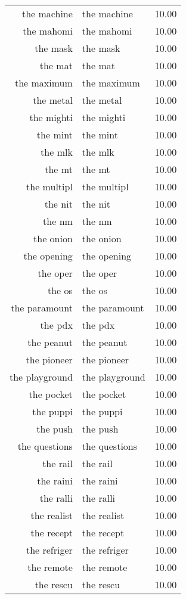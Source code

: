\begin{table}[ht]
\begin{tabular}{rlr}
  the machine & the machine & 10.00 \\ 
  the mahomi & the mahomi & 10.00 \\ 
  the mask & the mask & 10.00 \\ 
  the mat & the mat & 10.00 \\ 
  the maximum & the maximum & 10.00 \\ 
  the metal & the metal & 10.00 \\ 
  the mighti & the mighti & 10.00 \\ 
  the mint & the mint & 10.00 \\ 
  the mlk & the mlk & 10.00 \\ 
  the mt & the mt & 10.00 \\ 
  the multipl & the multipl & 10.00 \\ 
  the nit & the nit & 10.00 \\ 
  the nm & the nm & 10.00 \\ 
  the onion & the onion & 10.00 \\ 
  the opening & the opening & 10.00 \\ 
  the oper & the oper & 10.00 \\ 
  the os & the os & 10.00 \\ 
  the paramount & the paramount & 10.00 \\ 
  the pdx & the pdx & 10.00 \\ 
  the peanut & the peanut & 10.00 \\ 
  the pioneer & the pioneer & 10.00 \\ 
  the playground & the playground & 10.00 \\ 
  the pocket & the pocket & 10.00 \\ 
  the puppi & the puppi & 10.00 \\ 
  the push & the push & 10.00 \\ 
  the questions & the questions & 10.00 \\ 
  the rail & the rail & 10.00 \\ 
  the raini & the raini & 10.00 \\ 
  the ralli & the ralli & 10.00 \\ 
  the realist & the realist & 10.00 \\ 
  the recept & the recept & 10.00 \\ 
  the refriger & the refriger & 10.00 \\ 
  the remote & the remote & 10.00 \\ 
  the rescu & the rescu & 10.00 \\ 

\end{tabular}
\end{table}
